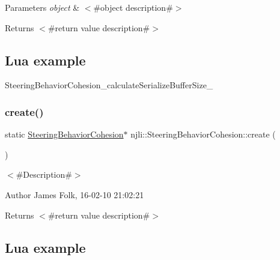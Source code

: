 \begin{DoxyParams}{Parameters}
{\em object} & $<$\#object description\#$>$\\
\hline
\end{DoxyParams}
\begin{DoxyReturn}{Returns}
$<$\#return value description\#$>$
\end{DoxyReturn}
\hypertarget{classnjli_1_1_steering_behavior_wander_ex1}{}\subsection{Lua example}\label{classnjli_1_1_steering_behavior_wander_ex1}

\begin{DoxyCodeInclude}
\end{DoxyCodeInclude}
Steering\+Behavior\+Cohesion\+\_\+calculate\+Serialize\+Buffer\+Size\+\_\+ \mbox{\label{classnjli_1_1_steering_behavior_cohesion_a5cfbb1db9c82f6517dbf6f354624a0cf}} 
\subsubsection{\texorpdfstring{create()}{create()}\hspace{0.1cm}{\footnotesize\ttfamily [1/2]}}
{\footnotesize\ttfamily static \mbox{\hyperlink{classnjli_1_1_steering_behavior_cohesion}{Steering\+Behavior\+Cohesion}}$\ast$ njli\+::\+Steering\+Behavior\+Cohesion\+::create (\begin{DoxyParamCaption}{ }\end{DoxyParamCaption})\hspace{0.3cm}{\ttfamily [static]}}



$<$\#\+Description\#$>$ 

\begin{DoxyAuthor}{Author}
James Folk, 16-\/02-\/10 21\+:02\+:21
\end{DoxyAuthor}
\begin{DoxyReturn}{Returns}
$<$\#return value description\#$>$
\end{DoxyReturn}
\hypertarget{classnjli_1_1_steering_behavior_wander_ex1}{}\subsection{Lua example}\label{classnjli_1_1_steering_behavior_wander_ex1}

